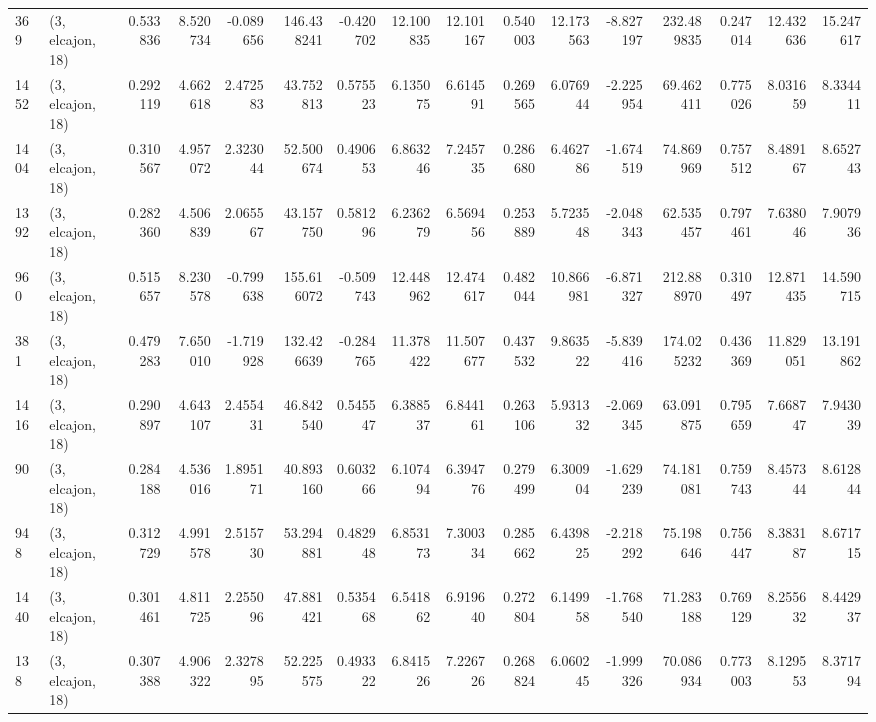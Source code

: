 \begin{tabular}{llrrrrrrrrrrrrrr}
369  &  (3, elcajon, 18) &   0.533836 &   8.520734 &  -0.089656 &    146.438241 &   -0.420702 &   12.100835 &   12.101167 &  0.540003 &  12.173563 &  -8.827197 &   232.489835 &   0.247014 &  12.432636 &  15.247617 \\
1452 &  (3, elcajon, 18) &   0.292119 &   4.662618 &   2.472583 &     43.752813 &    0.575523 &    6.135075 &    6.614591 &  0.269565 &   6.076944 &  -2.225954 &    69.462411 &   0.775026 &   8.031659 &   8.334411 \\
1404 &  (3, elcajon, 18) &   0.310567 &   4.957072 &   2.323044 &     52.500674 &    0.490653 &    6.863246 &    7.245735 &  0.286680 &   6.462786 &  -1.674519 &    74.869969 &   0.757512 &   8.489167 &   8.652743 \\
1392 &  (3, elcajon, 18) &   0.282360 &   4.506839 &   2.065567 &     43.157750 &    0.581296 &    6.236279 &    6.569456 &  0.253889 &   5.723548 &  -2.048343 &    62.535457 &   0.797461 &   7.638046 &   7.907936 \\
960  &  (3, elcajon, 18) &   0.515657 &   8.230578 &  -0.799638 &    155.616072 &   -0.509743 &   12.448962 &   12.474617 &  0.482044 &  10.866981 &  -6.871327 &   212.888970 &   0.310497 &  12.871435 &  14.590715 \\
381  &  (3, elcajon, 18) &   0.479283 &   7.650010 &  -1.719928 &    132.426639 &   -0.284765 &   11.378422 &   11.507677 &  0.437532 &   9.863522 &  -5.839416 &   174.025232 &   0.436369 &  11.829051 &  13.191862 \\
1416 &  (3, elcajon, 18) &   0.290897 &   4.643107 &   2.455431 &     46.842540 &    0.545547 &    6.388537 &    6.844161 &  0.263106 &   5.931332 &  -2.069345 &    63.091875 &   0.795659 &   7.668747 &   7.943039 \\
90   &  (3, elcajon, 18) &   0.284188 &   4.536016 &   1.895171 &     40.893160 &    0.603266 &    6.107494 &    6.394776 &  0.279499 &   6.300904 &  -1.629239 &    74.181081 &   0.759743 &   8.457344 &   8.612844 \\
948  &  (3, elcajon, 18) &   0.312729 &   4.991578 &   2.515730 &     53.294881 &    0.482948 &    6.853173 &    7.300334 &  0.285662 &   6.439825 &  -2.218292 &    75.198646 &   0.756447 &   8.383187 &   8.671715 \\
1440 &  (3, elcajon, 18) &   0.301461 &   4.811725 &   2.255096 &     47.881421 &    0.535468 &    6.541862 &    6.919640 &  0.272804 &   6.149958 &  -1.768540 &    71.283188 &   0.769129 &   8.255632 &   8.442937 \\
138  &  (3, elcajon, 18) &   0.307388 &   4.906322 &   2.327895 &     52.225575 &    0.493322 &    6.841526 &    7.226726 &  0.268824 &   6.060245 &  -1.999326 &    70.086934 &   0.773003 &   8.129553 &   8.371794 \\

\end{tabular}
